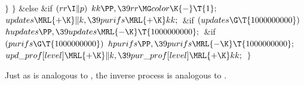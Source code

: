 \4${}\}{}$\2\6
\4${}\}{}$\5
\2\&{else} \&{if} ${}(\\{rr}\I\|p){}$\1\5
${}\\{kk}\PP,\39\\{rr}\MG\\{color}\K{-}\T{1};{}$\2\2\6
${}\\{updates}\MRL{+{\K}}\|k,\39\\{purifs}\MRL{+{\K}}\\{kk};{}$\6
\&{if} ${}(\\{updates}\G\T{1000000000}){}$\1\5
${}\\{hupdates}\PP,\39\\{updates}\MRL{-{\K}}\T{1000000000};{}$\2\6
\&{if} ${}(\\{purifs}\G\T{1000000000}){}$\1\5
${}\\{hpurifs}\PP,\39\\{purifs}\MRL{-{\K}}\T{1000000000};{}$\2\6
${}\\{upd\_prof}[\\{level}]\MRL{+{\K}}\|k,\39\\{pur\_prof}[\\{level}]\MRL{+{%
\K}}\\{kk};{}$\6
\4${}\}{}$\2\par
\fi

Just as  is analogous to , the
inverse process is analogous
to .

